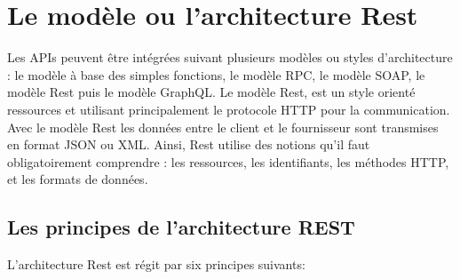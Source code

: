 \section{Le modèle ou l'architecture Rest}
Les APIs peuvent être intégrées suivant plusieurs modèles ou styles d’architecture : le modèle à base des
simples fonctions, le modèle RPC, le modèle SOAP, le modèle Rest puis le modèle GraphQL.
Le modèle Rest, est un style orienté ressources et utilisant principalement le protocole HTTP pour la communication. Avec le modèle Rest les données entre le client et le fournisseur sont transmises en format JSON ou
XML. Ainsi, Rest utilise des notions qu’il faut obligatoirement comprendre : les ressources, les identifiants, les méthodes HTTP, et les formats de données.
\subsection{Les principes de l’architecture REST}
L'architecture Rest est régit par six principes suivants:
